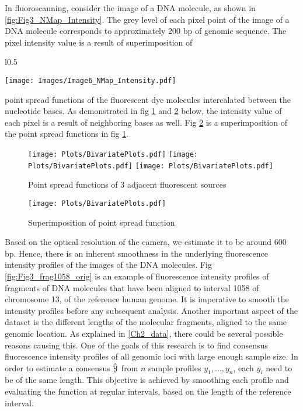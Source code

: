 In fluoroscanning, consider the image of a DNA molecule, as shown in \ref{fig:Fig3_NMap_Intensity}. The grey level of each pixel point of the image of a DNA molecule corresponds to approximately 200 bp of genomic sequence. The pixel intensity value is a result of superimposition of 
\begin{wrapfigure}{l}{0.5\textwidth}
\begin{center}
\texttt{[image: Images/Image6\_NMap\_Intensity.pdf]}
\end{center}
\caption{Image of DNA molecule}
\label{fig:Fig3_NMap_Intensity}
\end{wrapfigure}
point spread functions of the fluorescent dye molecules intercalated between the nucleotide bases. As demonstrated in fig \ref{fig:Fig3_Bivariate1} and \ref{fig:Fig3_Bivariate2} below, the intensity value of each pixel is a result of neighboring bases as well. Fig \ref{fig:Fig3_Bivariate2} is a superimposition of the point spread functions in fig \ref{fig:Fig3_Bivariate1}.  

\begin{figure}[H]
\begin{center}
\texttt{[image: Plots/BivariatePlots.pdf]}
\texttt{[image: Plots/BivariatePlots.pdf]}
\texttt{[image: Plots/BivariatePlots.pdf]}
\end{center}
\caption{Point spread functions of 3 adjacent fluorescent sources}
\label{fig:Fig3_Bivariate1}
\end{figure}

\begin{figure}[H]
\begin{center}
\texttt{[image: Plots/BivariatePlots.pdf]}
\end{center}
\caption{Superimposition of point spread function}
\label{fig:Fig3_Bivariate2}
\end{figure}
Based on the optical resolution of the camera, we estimate it to be around 600 bp. Hence, there is an inherent smoothness in the underlying fluorescence intensity profiles of the images of the DNA molecules. Fig \ref{fig:Fig3_frag1058_orig} is an example of fluorescence intensity profiles of fragments of DNA molecules that have been aligned to interval 1058 of chromosome 13, of the reference human genome. It is imperative to smooth the intensity profiles before any subsequent analysis. Another important aspect of the dataset is the different lengths of the molecular fragments, aligned to the same genomic location. As explained in \ref{Ch2_data}, there could be several possible reasons causing this. One of the goals of this research is to find consensus fluorescence intensity profiles of all genomic loci with large enough sample size. In order to estimate a consensus $\hat{\mathcal{Y}}$ from $n$ sample profiles $y_1, \dots, y_n$, each $y_i$ need to be of the same length. This objective is achieved by smoothing each profile and evaluating the function at regular intervals, based on the length of the reference interval. 

